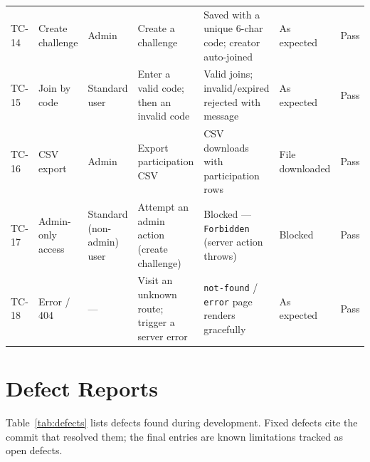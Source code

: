 \documentclass[11pt]{article}
\begin{document}
{\begin{longtable}{p{0.7cm} p{1.9cm} p{2.2cm} p{3.7cm} p{3.0cm} p{1.9cm} p{0.8cm}}
\addlinespace
TC-14 & Create challenge & Admin & Create a challenge & Saved with a unique
6-char code; creator auto-joined & As expected & Pass \\
\addlinespace
TC-15 & Join by code & Standard user & Enter a valid code; then an invalid
code & Valid joins; invalid/expired rejected with message & As expected &
Pass \\
\addlinespace
TC-16 & CSV export & Admin & Export participation CSV & CSV downloads with
participation rows & File downloaded & Pass \\
\addlinespace
TC-17 & Admin-only access & Standard (non-admin) user & Attempt an admin action
(create challenge) & Blocked --- \texttt{Forbidden} (server action throws) &
Blocked & Pass \\
\addlinespace
TC-18 & Error / 404 & --- & Visit an unknown route; trigger a server error &
\texttt{not-found} / \texttt{error} page renders gracefully & As expected &
Pass \\

\end{longtable}
}

\section{Defect Reports}

Table~\ref{tab:defects} lists defects found during development. Fixed defects
cite the commit that resolved them; the final entries are known limitations
tracked as open defects.
\end{document}

